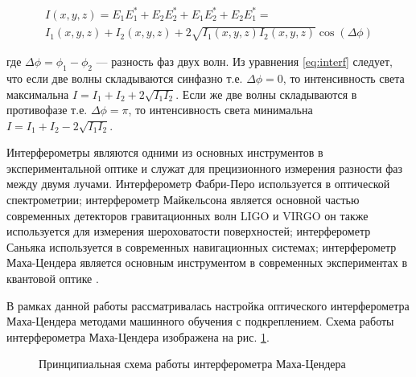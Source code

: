 \begin{multline}
    I(x, y, z) = E_1E_1^* + E_2E_2^* + E_1E_2^* + E_2E_1^* = \\
    I_1(x,y,z) + I_2(x,y,z) + 2 \sqrt{I_1(x,y,z)I_2(x,y,z)}\cos(\Delta \phi)
\label{eq:interf}
\end{multline}

где $\Delta \phi = \phi_1 - \phi_2$ --- разность фаз двух волн. Из уравнения \ref{eq:interf} следует, что если две волны складываются синфазно т.е. $\Delta \phi = 0$, то интенсивность света максимальна $I = I_1 + I_2 + 2\sqrt{I_1I_2}$. Если же две волны складываются в противофазе т.е. $\Delta \phi = \pi$, то интенсивность света минимальна $I = I_1 + I_2 - 2\sqrt{I_1I_2}$.


Интерферометры являются одними из основных инструментов в экспериментальной оптике и служат для прецизионного измерения разности фаз между двумя лучами. Интерферометр Фабри-Перо\cite{fabry-perot1899} используется в оптической спектрометрии; интерферометр Майкельсона является основной частью современных детекторов гравитационных волн LIGO и VIRGO \cite{LIGO, VIRGO} он также используется для измерения шероховатости поверхностей; интерферометр Саньяка используется в современных навигационных системах; интерферометр Маха-Цендера является основным инструментом в современных экспериментах в квантовой оптике \cite{Sarkar2006, Sychev2017}. 

В рамках данной работы рассматривалась настройка оптического интерферометра Маха-Цендера методами машинного обучения с подкреплением. Схема работы интерферометра Маха-Цендера изображена на рис. \ref{fig:MZI}. 

\begin{figure}[ht]
\caption{Принципиальная схема работы интерферометра Маха-Цендера}
\label{fig:MZI}
\end{figure}

